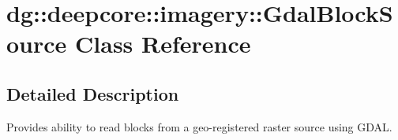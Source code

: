\hypertarget{classdg_1_1deepcore_1_1imagery_1_1_gdal_block_source}{}\section{dg\+:\+:deepcore\+:\+:imagery\+:\+:Gdal\+Block\+Source Class Reference}
\label{classdg_1_1deepcore_1_1imagery_1_1_gdal_block_source}


\subsection{Detailed Description}
Provides ability to read blocks from a geo-\/registered raster source using G\+D\+AL. 

{\bfseries }\tabulinesep=1mm
